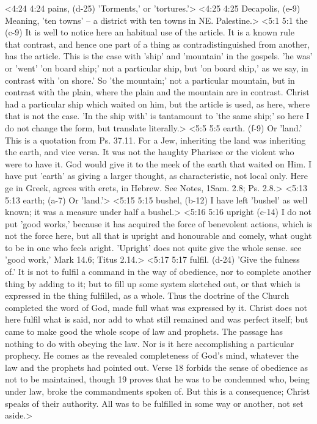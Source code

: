 <4:24 4:24  pains, (d-25)  'Torments,' or 'tortures.'>
<4:25 4:25  Decapolis, (e-9)  Meaning, 'ten towns' -- a district with ten towns in NE.  Palestine.>
<5:1 5:1  the (c-9)  It is well to notice here an habitual use of the article. It  is a known rule that contrast, and hence one part of a thing as  contradistinguished from another, has the article. This is the  case with 'ship' and 'mountain' in the gospels. 'he was' or  'went' 'on board ship;' not a particular ship, but 'on board  ship,' as we say, in contrast with 'on shore.' So 'the  mountain;' not a particular mountain, but in contrast with the  plain, where the plain and the mountain are in contrast. Christ  had a particular ship which waited on him, but the article is  used, as here, where that is not the case. 'In the ship with'  is tantamount to 'the same ship;' so here I do not change the  form, but translate literally.>
<5:5 5:5  earth. (f-9)  Or 'land.' This is a quotation from Ps. 37.11. For a Jew,  inheriting the land was inheriting the earth, and vice versa.  It was not the haughty Pharisee or the violent who were to have  it. God would give it to the meek of the earth that waited on  Him. I have put 'earth' as giving a larger thought, as  characteristic, not local only. Here ge in Greek, agrees with  erets, in Hebrew. See Notes, 1Sam. 2.8; Ps. 2.8.>
<5:13 5:13  earth; (a-7)  Or 'land.'>
<5:15 5:15  bushel, (b-12)  I have left 'bushel' as well known; it was a measure under  half a bushel.>
<5:16 5:16  upright (c-14)  I do not put 'good works,' because it has acquired the force  of benevolent actions, which is not the force here, but all  that is upright and honourable and comely, what ought to be in  one who feels aright. 'Upright' does not quite give the whole  sense. see 'good work,' Mark 14.6; Titus 2.14.>
<5:17 5:17  fulfil. (d-24)  'Give the fulness of.' It is not to fulfil a command in the  way of obedience, nor to complete another thing by adding to  it; but to fill up some system sketched out, or that which is  expressed in the thing fulfilled, as a whole. Thus the doctrine  of the Church completed the word of God, made full what was  expressed by it. Christ does not here fulfil what is said, nor  add to what still remained and was perfect itself; but came to  make good the whole scope of law and prophets. The passage has  nothing to do with obeying the law. Nor is it here  accomplishing a particular prophecy. He comes as the revealed  completeness of God's mind, whatever the law and the prophets  had pointed out. Verse 18 forbids the sense of obedience as not  to be maintained, though 19 proves that he was to be condemned  who, being under law, broke the commandments spoken of. But  this is a consequence; Christ speaks of their authority. All  was to be fulfilled in some way or another, not set aside.>
